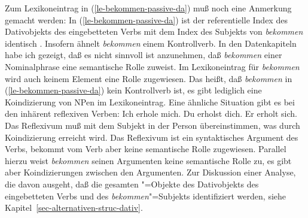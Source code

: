 \noindent
Zum Lexikoneintrag in (\ref{le-bekommen-passive-da}) muß noch eine Anmerkung gemacht werden:
In (\ref{le-bekommen-passive-da}) ist der referentielle Index des Dativobjekts des eingebetteten
Verbs mit dem Index des Subjekts von \emph{bekommen} identisch . Insofern
ähnelt \emph{bekommen} einem Kontrollverb. In den Datenkapiteln habe ich gezeigt,
daß es nicht sinnvoll ist anzunehmen, daß \emph{bekommen} einer Nominalphrase eine
semantische Rolle zuweist. Im Lexikoneintrag für \emph{bekommen} wird auch keinem Element eine
Rolle zugewiesen. Das heißt, daß \emph{bekommen} in (\ref{le-bekommen-passive-da}) kein Kontrollverb ist,
es gibt lediglich eine Koindizierung von NPen im Lexikoneintrag. Eine ähnliche Situation gibt
es bei den inhärent reflexiven Verben:
\eal
\ex Ich erhole mich.
\ex Du erholst dich.
\ex Er erholt sich.
\zl
Das Reflexivum muß mit dem Subjekt in der Person übereinstimmen, was durch Koindizierung erreicht wird.
Das Reflexivum ist ein syntaktisches Argument des Verbs, bekommt vom Verb aber keine semantische Rolle zugewiesen.
Parallel hierzu weist \emph{bekommen} seinen Argumenten keine semantische
Rolle zu, es gibt aber Koindizierungen zwischen den Argumenten. Zur Diskussion einer Analyse,
die davon ausgeht, daß die gesamten "=Objekte des Dativobjekts des eingebetteten Verbs
und des \emph{bekommen}"=Subjekts identifiziert werden, siehe Kapitel~\ref{sec-alternativen-struc-dativ}.


\begin{comment}
The embedding of the dative passive under {\em sein}, which is marginally possible \citep[\page6]{Haider86}\ia{Haider},
can also be explained:
\eal
\label{ex-ist-zu-bekommen}
\ex[?]{
So   etwas     ist leicht geschenkt zu kriegen.
}
\ex[?]{
So ein Preis ist leicht zugesprochen zu kriegen.
}
\zl
Since the lexical entry of \emph{zu kriegen}, which is parallel to that of \emph{bekommen}
we saw in (\ref{le-bekommen}), is specified to raise the \textsc{acc} value of its verbal complement
\emph{geschenkt} in (\mex{0}a), the modal \sein can raise the object of \emph{geschenkt zu kriegen}
to the subject of the complete verbal complex.
Unfortunately this specification of \accf also allows sentences like (\mex{1}) which
I find unacceptable:
\ea[*]{
In diesem Saal sind viele Preise verliehen bekommen worden.\footnote{
        \citet{Kathol91a}\ia{Kathol} marks this sentences with a question mark.
}
}
\z
(\mex{-1}) and (\mex{0}) can be ruled out by assuming that the dative passive auxiliary
is unakkusativisch as the other passive auxiliaries, \ie, that the \textsc{subj} value and the
\textsc{acc} value of \emph{bekommen} are identical.
\end{comment}




